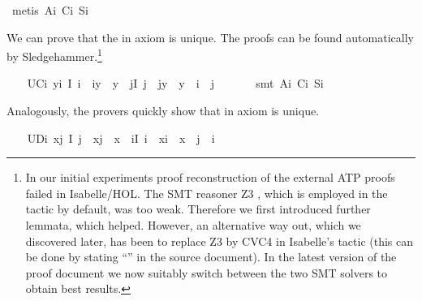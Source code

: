 \begin{isabellebody}
\ {\isacharparenleft}metis\ A\isactrlsub i\ C\isactrlsub i\ S\isactrlsub i{\isacharparenright}%
\endisatagproof
{\isafoldproof}%
%
\isadelimproof
%
\endisadelimproof
%
\begin{isamarkuptext}%
We can prove that the  in axiom  is unique. The proofs can be 
   found automatically by Sledgehammer.\footnote{In our initial experiments proof reconstruction of the
   external ATP proofs failed in Isabelle/HOL. The SMT reasoner Z3 \cite{Z3}, which is employed
   in the  tactic by default, was too weak. Therefore we first introduced further lemmata, 
   which helped. 
   However, an alternative way out, which we discovered later, has been to replace Z3 by CVC4 \cite{CVC4} 
   in Isabelle's  
   tactic (this can be done by stating ``'' in the source document).
   In the latest version of the proof document we now suitably switch between the two SMT solvers to obtain best results.}%
\end{isamarkuptext}\isamarkuptrue%
\ \ \isamarkupfalse%
\ UC\isactrlsub i{\isacharcolon}\ {\isachardoublequoteopen}\isactrlbold {\isasymforall}y{\isachardot}\isactrlbold {\isasymexists}i{\isachardot}\ I\ i\ \isactrlbold {\isasymand}\ i{\isasymcdot}y\ {\isasymcong}\ y\ \isactrlbold {\isasymand}\ {\isacharparenleft}\isactrlbold {\isasymforall}j{\isachardot}{\isacharparenleft}I\ j\ \isactrlbold {\isasymand}\ j{\isasymcdot}y\ {\isasymcong}\ y{\isacharparenright}\ \isactrlbold {\isasymrightarrow}\ i\ {\isasymcong}\ j{\isacharparenright}{\isachardoublequoteclose}\ \isanewline
%
\isadelimproof
\ \ \ \ %
\endisadelimproof
%
\isatagproof
{}\isamarkupfalse%
\ {\isacharparenleft}smt\ A\isactrlsub i\ C\isactrlsub i\ S\isactrlsub i{\isacharparenright}%
\endisatagproof
{\isafoldproof}%
%
\isadelimproof
%
\endisadelimproof
%
\begin{isamarkuptext}%
Analogously, the provers quickly show that  in axiom  is unique.%
\end{isamarkuptext}\isamarkuptrue%
\ \ \isamarkupfalse%
\ UD\isactrlsub i{\isacharcolon}\ {\isachardoublequoteopen}\isactrlbold {\isasymforall}x{\isachardot}\isactrlbold {\isasymexists}j{\isachardot}\ I\ j\ \isactrlbold {\isasymand}\ x{\isasymcdot}j\ {\isasymcong}\ x\ \isactrlbold {\isasymand}\ {\isacharparenleft}\isactrlbold {\isasymforall}i{\isachardot}{\isacharparenleft}I\ i\ \isactrlbold {\isasymand}\ x{\isasymcdot}i\ {\isasymcong}\ x{\isacharparenright}\ \isactrlbold {\isasymrightarrow}\ j\ {\isasymcong}\ i{\isacharparenright}{\isachardoublequoteclose}\ \ \isanewline

\end{isabellebody}
